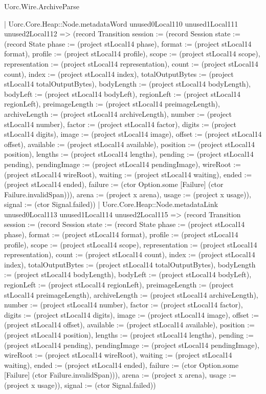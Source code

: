 \begin{lexlean}{Uorc.Wire.ArchiveParse}
\begin{semanticmodule}
{            | Uorc.Core.Heap::Node.metadataWord unused0Local110 unused1Local111 unused2Local112 => (record Transition {session := (record Session {state := (record State {phase := (project stLocal14 phase), format := (project stLocal14 format), profile := (project stLocal14 profile), scope := (project stLocal14 scope), representation := (project stLocal14 representation), count := (project stLocal14 count), index := (project stLocal14 index), totalOutputBytes := (project stLocal14 totalOutputBytes), bodyLength := (project stLocal14 bodyLength), bodyLeft := (project stLocal14 bodyLeft), regionLeft := (project stLocal14 regionLeft), preimageLength := (project stLocal14 preimageLength), archiveLength := (project stLocal14 archiveLength), number := (project stLocal14 number), factor := (project stLocal14 factor), digits := (project stLocal14 digits), image := (project stLocal14 image), offset := (project stLocal14 offset), available := (project stLocal14 available), position := (project stLocal14 position), lengths := (project stLocal14 lengths), pending := (project stLocal14 pending), pendingImage := (project stLocal14 pendingImage), wireRoot := (project stLocal14 wireRoot), waiting := (project stLocal14 waiting), ended := (project stLocal14 ended), failure := (ctor Option.some [Failure] (ctor Failure.invalidSpan))}), arena := (project x arena), usage := (project x usage)}), signal := (ctor Signal.failed)})
            | Uorc.Core.Heap::Node.metadataLink unused0Local113 unused1Local114 unused2Local115 => (record Transition {session := (record Session {state := (record State {phase := (project stLocal14 phase), format := (project stLocal14 format), profile := (project stLocal14 profile), scope := (project stLocal14 scope), representation := (project stLocal14 representation), count := (project stLocal14 count), index := (project stLocal14 index), totalOutputBytes := (project stLocal14 totalOutputBytes), bodyLength := (project stLocal14 bodyLength), bodyLeft := (project stLocal14 bodyLeft), regionLeft := (project stLocal14 regionLeft), preimageLength := (project stLocal14 preimageLength), archiveLength := (project stLocal14 archiveLength), number := (project stLocal14 number), factor := (project stLocal14 factor), digits := (project stLocal14 digits), image := (project stLocal14 image), offset := (project stLocal14 offset), available := (project stLocal14 available), position := (project stLocal14 position), lengths := (project stLocal14 lengths), pending := (project stLocal14 pending), pendingImage := (project stLocal14 pendingImage), wireRoot := (project stLocal14 wireRoot), waiting := (project stLocal14 waiting), ended := (project stLocal14 ended), failure := (ctor Option.some [Failure] (ctor Failure.invalidSpan))}), arena := (project x arena), usage := (project x usage)}), signal := (ctor Signal.failed)})
}
\end{semanticmodule}
\end{lexlean}
